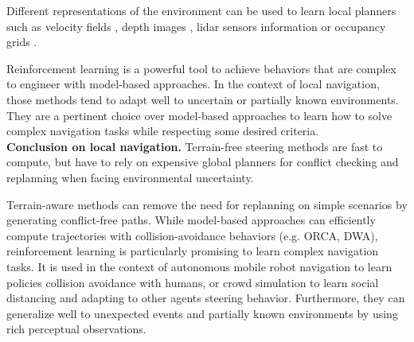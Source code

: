 Different representations of the environment can be used to learn local planners such as velocity fields \cite{deep_multiagent_crowd_2020}, depth images \cite{learn_steer_2018}, lidar sensors information \cite{prm_rl_2019, RL_RRT} or occupancy grids \cite{rl_navigation_video_game_2020}.

Reinforcement learning is a powerful tool to achieve behaviors that are complex to engineer with model-based approaches.
In the context of local navigation, those methods tend to adapt well to uncertain or partially known environments.
They are a pertinent choice over model-based approaches to learn how to solve complex navigation tasks while respecting some desired criteria.\\


\noindent\textbf{Conclusion on local navigation.}
Terrain-free steering methods are fast to compute, but have to rely on expensive global planners for conflict checking and replanning when facing environmental uncertainty.

Terrain-aware methods can remove the need for replanning on simple scenarios by generating conflict-free paths. %
While model-based approaches can efficiently compute trajectories with collision-avoidance behaviors (e.g. ORCA, DWA), reinforcement learning is particularly promising to learn complex navigation tasks.
It is used in the context of autonomous mobile robot navigation to learn policies collision avoidance with humans, or crowd simulation to learn social distancing and adapting to other agents steering behavior. 
Furthermore, they can generalize well to unexpected events and partially known environments by using rich perceptual observations.


\newpage

